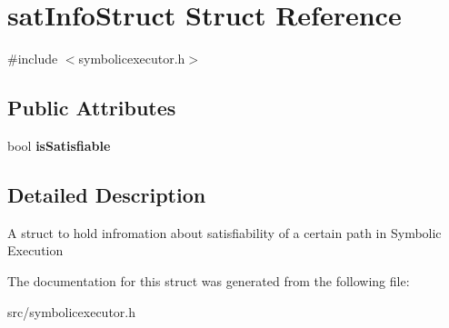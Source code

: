 \hypertarget{structsatInfoStruct}{}\section{sat\+Info\+Struct Struct Reference}
\label{structsatInfoStruct}


{\ttfamily \#include $<$symbolicexecutor.\+h$>$}

\subsection*{Public Attributes}
\begin{DoxyCompactItemize}
\item 
bool {\bfseries is\+Satisfiable}\hypertarget{structsatInfoStruct_a9045946c08f92055f4cacf1db9fbef47}{}\label{structsatInfoStruct_a9045946c08f92055f4cacf1db9fbef47}

\end{DoxyCompactItemize}


\subsection{Detailed Description}
A struct to hold infromation about satisfiability of a certain path in Symbolic Execution 

The documentation for this struct was generated from the following file\+:\begin{DoxyCompactItemize}
\item 
src/symbolicexecutor.\+h\end{DoxyCompactItemize}
